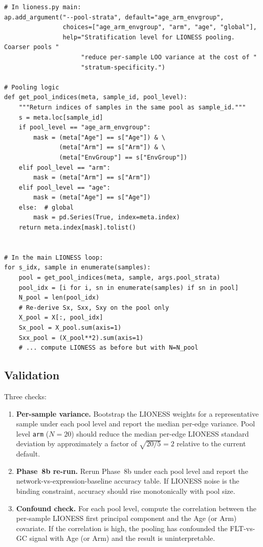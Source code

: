 \documentclass[11pt]{article}
\newcommand{\code}[1]{\texttt{#1}}
\begin{document}
\begin{lstlisting}[style=pythonstyle,caption={Stratified pooling parameter for LIONESS.}]
# In lioness.py main:
ap.add_argument("--pool-strata", default="age_arm_envgroup",
                choices=["age_arm_envgroup", "arm", "age", "global"],
                help="Stratification level for LIONESS pooling. Coarser pools "
                     "reduce per-sample LOO variance at the cost of "
                     "stratum-specificity.")

# Pooling logic
def get_pool_indices(meta, sample_id, pool_level):
    """Return indices of samples in the same pool as sample_id."""
    s = meta.loc[sample_id]
    if pool_level == "age_arm_envgroup":
        mask = (meta["Age"] == s["Age"]) & \
               (meta["Arm"] == s["Arm"]) & \
               (meta["EnvGroup"] == s["EnvGroup"])
    elif pool_level == "arm":
        mask = (meta["Arm"] == s["Arm"])
    elif pool_level == "age":
        mask = (meta["Age"] == s["Age"])
    else:  # global
        mask = pd.Series(True, index=meta.index)
    return meta.index[mask].tolist()


# In the main LIONESS loop:
for s_idx, sample in enumerate(samples):
    pool = get_pool_indices(meta, sample, args.pool_strata)
    pool_idx = [i for i, sn in enumerate(samples) if sn in pool]
    N_pool = len(pool_idx)
    # Re-derive Sx, Sxx, Sxy on the pool only
    X_pool = X[:, pool_idx]
    Sx_pool = X_pool.sum(axis=1)
    Sxx_pool = (X_pool**2).sum(axis=1)
    # ... compute LIONESS as before but with N=N_pool
\end{lstlisting}

\subsection{Validation}

Three checks:

\begin{enumerate}[leftmargin=*]
\item \textbf{Per-sample variance.} Bootstrap the LIONESS weights for a representative sample under each pool level and report the median per-edge variance. Pool level \code{arm} ($N=20$) should reduce the median per-edge LIONESS standard deviation by approximately a factor of $\sqrt{20/5} = 2$ relative to the current default.
\item \textbf{Phase~8b re-run.} Rerun Phase~8b under each pool level and report the network-vs-expression-baseline accuracy table. If LIONESS noise is the binding constraint, accuracy should rise monotonically with pool size.
\item \textbf{Confound check.} For each pool level, compute the correlation between the per-sample LIONESS first principal component and the Age (or Arm) covariate. If the correlation is high, the pooling has confounded the FLT-vs-GC signal with Age (or Arm) and the result is uninterpretable.
\end{enumerate}
\end{document}
